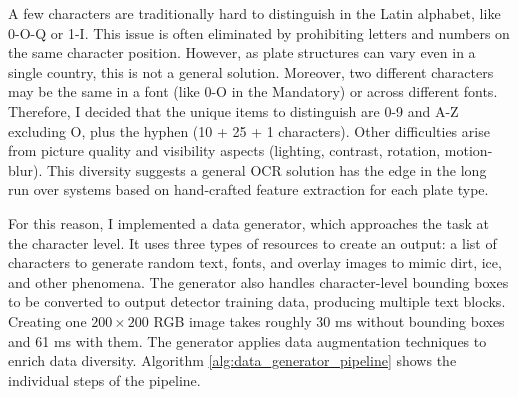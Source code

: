 A few characters are traditionally hard to distinguish in the Latin alphabet, like 0-O-Q or 1-I. This issue is often eliminated by prohibiting letters and numbers on the same character position. However, as plate structures can vary even in a single country, this is not a general solution. Moreover, two different characters may be the same in a font (like 0-O in the Mandatory) or across different fonts. Therefore, I decided that the unique items to distinguish are 0-9 and A-Z excluding O, plus the hyphen (10 + 25 + 1 characters). Other difficulties arise from picture quality and visibility aspects (lighting, contrast, rotation, motion-blur). This diversity suggests a general OCR solution has the edge in the long run over systems based on hand-crafted feature extraction for each plate type.

For this reason, I implemented a data generator, which approaches the task at the character level. It uses three types of resources to create an output: a list of characters to generate random text, fonts, and overlay images to mimic dirt, ice, and other phenomena. The generator also handles character-level bounding boxes to be converted to output detector training data, producing multiple text blocks. Creating one $200\times200$ RGB image takes roughly 30 ms without bounding boxes and 61 ms with them. The generator applies data augmentation techniques to enrich data diversity. Algorithm \ref{alg:data_generator_pipeline} shows the individual steps of the pipeline.

